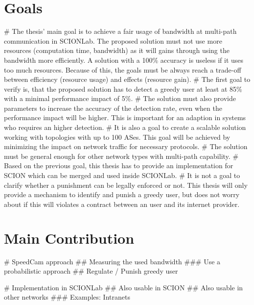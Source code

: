 \documentclass[thesis.tex]{subfiles}
\begin{document}
\section{Goals} \label{bib:goals}
     \begin{easylist}
        \MyListProperties        
        # The thesis' main goal is to achieve a fair usage of bandwidth at multi-path communication in SCIONLab. The proposed solution must not use more resources (computation time, bandwidth) as it will gains through using the bandwidth more efficiently. A solution with a 100\% accuracy is useless if it uses too much resources. Because of this, the goals must be always reach a trade-off between efficiency (resource usage) and effects (resource gain).        
        # The first goal to verify is, that the proposed solution has to detect a greedy user at least at 85\% with a minimal performance impact of 5\%.         
        # The solution must also provide parameters to increase the accuracy of the detection rate, even when the performance impact will be higher. This is important for an adaption in systems who requires an higher detection.
        # It is also a goal to create a scalable solution working with topologies with up to 100 ASes. This goal will be achieved by minimizing the impact on network traffic for necessary protocols.        
        # The solution must be general enough for other network types with multi-path capability.        
        # Based on the previous goal, this thesis has to provide an implementation for SCION which can be merged and used inside SCIONLab.
        # It is not a goal to clarify whether a punishment can be legally enforced or not. This thesis will only provide a mechanism to identify and punish a greedy user, but does not worry about if this will violates a contract between an user and its internet provider.
    \end{easylist}

\section{Main Contribution}
    \begin{easylist}
        \MyListProperties
        # SpeedCam approach
        ## Measuring the used bandwidth
        ### Use a probabilistic approach 
        ## Regulate  / Punish greedy user
        
        # Implementation in SCIONLab
        ## Also usable in SCION
        ## Also usable in other networks
        ### Examples: Intranets 
    \end{easylist}
\end{document}
